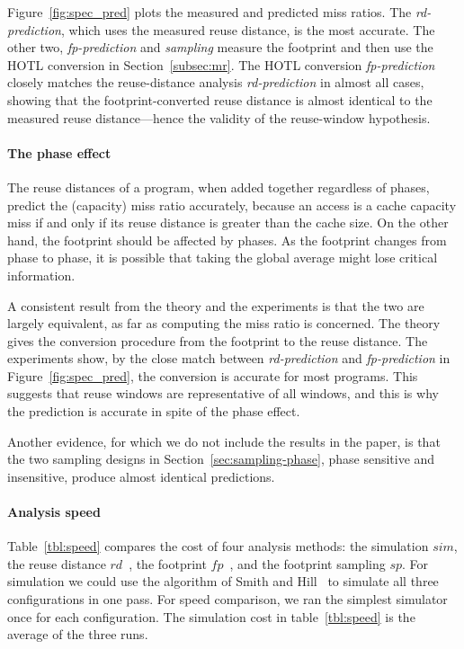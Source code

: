 Figure~\ref{fig:spec_pred} plots the measured and predicted miss ratios.
The \emph{rd-prediction}, which uses the measured reuse distance, is the
most accurate.  The other two, \emph{fp-prediction} and \emph{sampling}
measure the footprint and then use the HOTL conversion in
Section~\ref{subsec:mr}.  The HOTL conversion \emph{fp-prediction}
closely matches the reuse-distance analysis \emph{rd-prediction} in
almost all cases, showing that the footprint-converted reuse distance
is almost identical to the measured reuse distance---hence the
validity of the reuse-window hypothesis.  

\paragraph{The phase effect}
The reuse distances of a program, when added together regardless of
phases, predict the (capacity) miss ratio accurately, because an
access is a cache capacity miss if and only if its reuse distance is
greater than the cache size.  On the other hand, the footprint should
be affected by phases.  As the footprint changes from phase to phase,
it is possible that taking the global average might lose critical
information.

A consistent result from the theory and the experiments is that the
two are largely equivalent, as far as computing the miss ratio is
concerned.  The theory gives the conversion procedure from the
footprint to the reuse distance.  The experiments show, by the
close match between \emph{rd-prediction} and \emph{fp-prediction} in
Figure~\ref{fig:spec_pred}, the conversion is accurate for most
programs.  This suggests that reuse windows are representative of all
windows, and this is why the prediction is accurate in spite of the
phase effect.

Another evidence, for which we do not include the results in the
paper, is that the two sampling designs in Section~\ref{sec:sampling-phase},
phase sensitive and insensitive, produce almost identical predictions.

\paragraph{Analysis speed}
Table~\ref{tbl:speed} compares the cost of four analysis methods: the
simulation
$sim$, the reuse distance $rd$~\cite{Zhong+:TOPLAS09}, the footprint
$fp$~\cite{Xiang+:PACT11}, and the footprint sampling $sp$.  For simulation we could use the
algorithm of Smith and Hill~\cite{HillS:TOC89} to simulate all three
configurations in one pass.  For speed comparison, we ran the simplest
simulator once for each configuration.  The simulation cost in
table~\ref{tbl:speed} is the average of the three runs.

